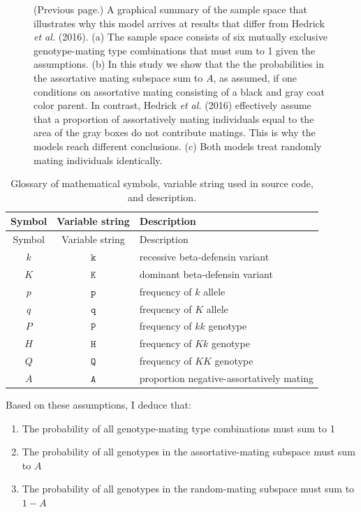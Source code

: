 \documentclass[
]{article}
\providecommand{\tightlist}{%
  \setlength{\itemsep}{0pt}\setlength{\parskip}{0pt}}
\begin{document}
\begin{figure} [t!]
\caption{(Previous page.) A graphical summary of the sample space that illustrates why this model arrives at results that differ from Hedrick \textit{et al.} (2016). (a) The sample space consists of six mutually exclusive genotype-mating type combinations that must sum to 1 given the assumptions. (b) In this study we show that the the probabilities in the assortative mating subspace sum to $A$, as assumed, if one conditions on assortative mating consisting of a black and gray coat color parent. In contrast, Hedrick \textit{et al.} (2016) effectively assume that a proportion of assortatively mating individuals equal to the area of the gray boxes do not contribute matings. This is why the models reach different conclusions. (c) Both models treat randomly mating individuals identically.}
\end{figure}

\begin{longtable}[]{@{}ccl@{}}
\caption{\label{tab:symbols}Glossary of mathematical symbols, variable string used in source code, and description.}\tabularnewline
\toprule()
Symbol & Variable string & Description \\
\midrule()
\endfirsthead
\toprule()
Symbol & Variable string & Description \\
\midrule()
\endhead
\(k\) & \(\mathtt{k}\) & recessive beta-defensin variant \\
\(K\) & \(\mathtt{K}\) & dominant beta-defensin variant \\
\(p\) & \(\mathtt{p}\) & frequency of \(\textit{k}\) allele \\
\(q\) & \(\mathtt{q}\) & frequency of \(\textit{K}\) allele \\
\(P\) & \(\mathtt{P}\) & frequency of \(\textit{kk}\) genotype \\
\(H\) & \(\mathtt{H}\) & frequency of \(\textit{Kk}\) genotype \\
\(Q\) & \(\mathtt{Q}\) & frequency of \(\textit{KK}\) genotype \\
\(A\) & \(\mathtt{A}\) & proportion negative-assortatively mating \\
\bottomrule()
\end{longtable}

Based on these assumptions, I deduce that:

\begin{enumerate}
\def\labelenumi{\arabic{enumi}.}
\tightlist
\item
  The probability of all genotype-mating type combinations must sum to 1
\item
  The probability of all genotypes in the assortative-mating subspace must sum to \(A\)
\item
  The probability of all genotypes in the random-mating subspace must sum to \(1-A\)
\end{enumerate}
\end{document}
